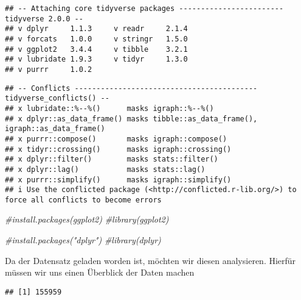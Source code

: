 \documentclass[
]{article}
\newenvironment{Shaded}{\begin{snugshade}}{\end{snugshade}}
\newcommand{\CommentTok}[1]{\textcolor[rgb]{0.56,0.35,0.01}{\textit{#1}}}
\newcommand{\FunctionTok}[1]{\textcolor[rgb]{0.13,0.29,0.53}{\textbf{#1}}}
\newcommand{\NormalTok}[1]{#1}
\newcommand{\SpecialCharTok}[1]{\textcolor[rgb]{0.81,0.36,0.00}{\textbf{#1}}}
\begin{document}
\begin{verbatim}
## -- Attaching core tidyverse packages ------------------------ tidyverse 2.0.0 --
## v dplyr     1.1.3     v readr     2.1.4
## v forcats   1.0.0     v stringr   1.5.0
## v ggplot2   3.4.4     v tibble    3.2.1
## v lubridate 1.9.3     v tidyr     1.3.0
## v purrr     1.0.2
\end{verbatim}

\begin{verbatim}
## -- Conflicts ------------------------------------------ tidyverse_conflicts() --
## x lubridate::%--%()      masks igraph::%--%()
## x dplyr::as_data_frame() masks tibble::as_data_frame(), igraph::as_data_frame()
## x purrr::compose()       masks igraph::compose()
## x tidyr::crossing()      masks igraph::crossing()
## x dplyr::filter()        masks stats::filter()
## x dplyr::lag()           masks stats::lag()
## x purrr::simplify()      masks igraph::simplify()
## i Use the conflicted package (<http://conflicted.r-lib.org/>) to force all conflicts to become errors
\end{verbatim}

\begin{Shaded}
\begin{Highlighting}[]
\CommentTok{\#install.packages(ggplot2)}
\CommentTok{\#library(ggplot2)}

\CommentTok{\#install.packages("dplyr")}
\CommentTok{\#library(dplyr)}
\end{Highlighting}
\end{Shaded}

Da der Datensatz geladen worden ist, möchten wir diesen analysieren.
Hierfür müssen wir uns einen Überblick der Daten machen

\begin{Shaded}
\end{Shaded}

\begin{verbatim}
## [1] 155959
\end{verbatim}

\begin{Shaded}
\end{Shaded}
\end{document}
